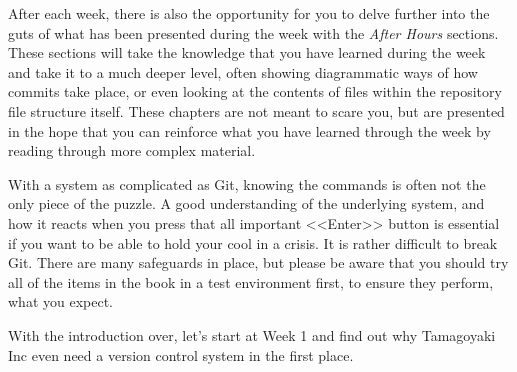 After each week, there is also the opportunity for you to delve further into the guts of what has been presented during the week with the \emph{After Hours} sections.  These sections will take the knowledge that you have learned during the week and take it to a much deeper level, often showing diagrammatic ways of how commits take place, or even looking at the contents of files within the repository file structure itself.  These chapters are not meant to scare you, but are presented in the hope that you can reinforce what you have learned through the week by reading through more complex material.

With a system as complicated as Git, knowing the commands is often not the only piece of the puzzle.  A good understanding of the underlying system, and how it reacts when you press that all important <<Enter>> button is essential if you want to be able to hold your cool in a crisis.  It is rather difficult to break Git.  There are many safeguards in place, but please be aware that you should try all of the items in the book in a test environment first, to ensure they perform, what you expect.  

With the introduction over, let's start at Week 1 and find out why Tamagoyaki Inc even need a version control system in the first place.
